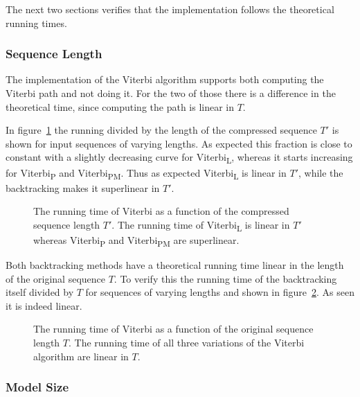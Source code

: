 The next two sections verifies that the implementation follows the theoretical
running times.

\subsubsection{Sequence Length}

The implementation of the Viterbi algorithm supports both computing the Viterbi
path and not doing it. For the two of those there is a difference in the
theoretical time, since computing the path is linear in $T$.

In figure~\ref{fig:assymptotic_viterbi_T} the running divided by the length of
the compressed sequence $T'$ is shown for input sequences of varying
lengths. As expected this fraction is close to constant with a slightly
decreasing curve for Viterbi\textsubscript{L}, whereas it starts increasing for Viterbi\textsubscript{P} and
Viterbi\textsubscript{PM}. Thus as expected Viterbi\textsubscript{L} is linear in $T'$, while
the backtracking makes it superlinear in $T'$.

\begin{figure}
  \centering
  
  \caption{The running time of Viterbi as a function of the compressed sequence
    length $T'$. The running time of Viterbi\textsubscript{L} is linear in
    $T'$ whereas Viterbi\textsubscript{P} and Viterbi\textsubscript{PM} are
    superlinear.}
  \label{fig:assymptotic_viterbi_T}
\end{figure}

Both backtracking methods have a theoretical running time linear in the length
of the original sequence $T$. To verify this the running time of the
backtracking itself divided by $T$ for sequences of varying lengths and shown in
figure~\ref{fig:assymptotic_viterbi_backtrack_T}. As seen it is indeed linear.

\begin{figure}
  \centering
  
  \caption{The running time of Viterbi as a function of the original sequence
    length $T$. The running time of all three variations of the Viterbi
    algorithm are linear in $T$.}
  \label{fig:assymptotic_viterbi_backtrack_T}
\end{figure}

\subsubsection{Model Size}

